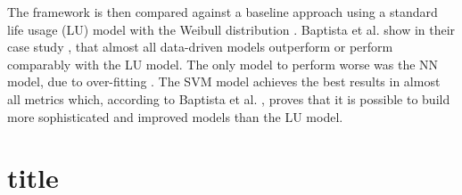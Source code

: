 The framework is then compared against a baseline approach using a standard life usage (LU) model  with the Weibull distribution . 
Baptista et al. show in their case study \cite{Baptista2018}, that almost all data-driven models outperform or perform comparably with the LU model.
The only model to perform worse was the NN model, due to over-fitting \cite{Baptista2018}.
The SVM model achieves the best results in almost all metrics which, according to Baptista et al. \cite{Baptista2018}, proves that it is possible to build more sophisticated and improved models than the LU model. 


\section{title}





